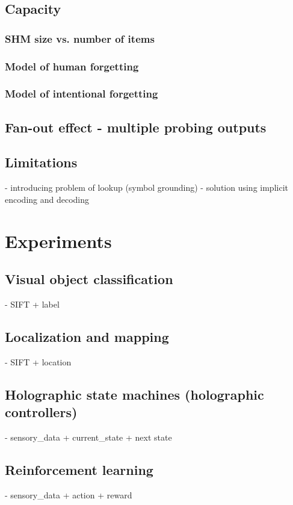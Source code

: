 \documentclass[conference]{IEEEtran}
\begin{document}
\subsection{Capacity}
\subsubsection{SHM size vs. number of items}
\subsubsection{Model of human forgetting}
\subsubsection{Model of intentional forgetting}

\subsection{Fan-out effect - multiple probing outputs}

\subsection{Limitations}

- introducing problem of lookup (symbol grounding)
- solution using implicit encoding and decoding

\section{Experiments}

\subsection{Visual object classification}
- SIFT + label
\subsection{Localization and mapping}
- SIFT + location
\subsection{Holographic state machines (holographic controllers)}
- sensory\_data + current\_state + next state
\subsection{Reinforcement learning}
- sensory\_data + action + reward
\end{document}
